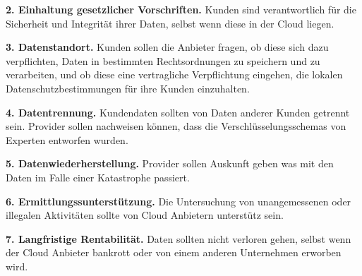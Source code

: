 \textbf{2. Einhaltung gesetzlicher Vorschriften.} Kunden sind verantwortlich für die Sicherheit und Integrität ihrer Daten, selbst wenn diese in der Cloud liegen.

\textbf{3. Datenstandort.} Kunden sollen die Anbieter fragen, ob diese sich dazu verpflichten, Daten in bestimmten Rechtsordnungen zu speichern und zu verarbeiten, und ob diese eine vertragliche Verpflichtung eingehen, die lokalen Datenschutzbestimmungen für ihre Kunden einzuhalten.

\textbf{4. Datentrennung.} Kundendaten sollten von Daten anderer Kunden getrennt sein. Provider sollen nachweisen können, dass die Verschlüsselungsschemas von Experten entworfen wurden.

\textbf{5. Datenwiederherstellung.} Provider sollen Auskunft geben was mit den Daten im Falle einer Katastrophe passiert.

\textbf{6. Ermittlungssunterstützung.} Die Untersuchung von unangemessenen oder illegalen Aktivitäten sollte von Cloud Anbietern unterstütz sein. 

\textbf{7. Langfristige Rentabilität.} Daten sollten nicht verloren gehen, selbst wenn der Cloud Anbieter bankrott oder von einem anderen Unternehmen erworben wird.


